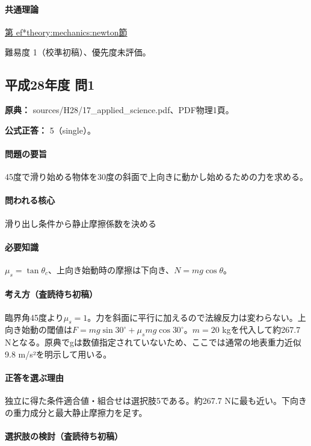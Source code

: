 \paragraph{共通理論} \hyperref[theory:mechanics:newton]{第
ef*{theory:mechanics:newton}節}

\par 難易度 1（校準初稿）、優先度未評価。

\subsection{平成28年度 問1}
\label{q:h28-reg-applied-01}

\noindent\textbf{原典：} sources/H28/17\_applied\_science.pdf、PDF物理1頁。

\textbf{公式正答：} 5（single）。

\paragraph{問題の要旨} 45度で滑り始める物体を30度の斜面で上向きに動かし始めるための力を求める。

\paragraph{問われる核心} 滑り出し条件から静止摩擦係数を決める

\paragraph{必要知識} \(\mu_s=\tan\theta_c\)、上向き始動時の摩擦は下向き、\(N=mg\cos\theta\)。

\paragraph{考え方（査読待ち初稿）} 臨界角45度より\(\mu_s=1\)。力を斜面に平行に加えるので法線反力は変わらない。上向き始動の閾値は\(F=mg\sin30^\circ+\mu_smg\cos30^\circ\)。\(m=20\) kgを代入して約267.7 Nとなる。原典でgは数値指定されていないため、ここでは通常の地表重力近似9.8 m/s²を明示して用いる。

\paragraph{正答を選ぶ理由} 独立に得た条件適合値・組合せは選択肢5である。約267.7 Nに最も近い。下向きの重力成分と最大静止摩擦力を足す。

\paragraph{選択肢の検討（査読待ち初稿）}

